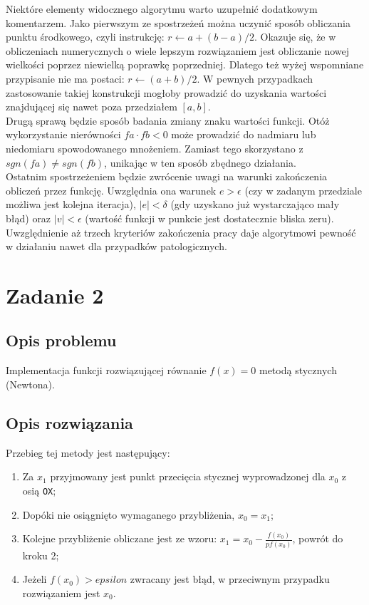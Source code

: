 \documentclass{classrep}
\begin{document}
		Niektóre elementy widocznego algorytmu warto uzupełnić dodatkowym komentarzem. Jako pierwszym ze spostrzeżeń można uczynić sposób obliczania punktu środkowego, czyli instrukcję: $r \leftarrow a+(b-a)/2$. Okazuje się, że w obliczeniach numerycznych o wiele lepszym rozwiązaniem jest obliczanie nowej wielkości poprzez niewielką poprawkę poprzedniej. Dlatego też wyżej wspomniane przypisanie nie ma postaci: $r \leftarrow (a+b)/2$. W pewnych przypadkach zastosowanie takiej konstrukcji mogłoby prowadzić do uzyskania wartości znajdującej się nawet poza przedziałem $[a,b]$.
		\\ Drugą sprawą będzie sposób badania zmiany znaku wartości funkcji. Otóż wykorzystanie nierówności $fa\cdot fb < 0$ może prowadzić do nadmiaru lub niedomiaru spowodowanego mnożeniem. Zamiast tego skorzystano z $sgn(fa) \neq sgn(fb)$, unikając w ten sposób zbędnego działania.
		\\ Ostatnim spostrzeżeniem będzie zwrócenie uwagi na warunki zakończenia obliczeń przez funkcję. Uwzględnia ona warunek $e > \epsilon$ (czy w zadanym przedziale możliwa jest kolejna iteracja), $|e| < \delta$ (gdy uzyskano już wystarczająco mały błąd) oraz $|v| < \epsilon$ (wartość funkcji w punkcie jest dostatecznie bliska zeru). Uwzględnienie aż trzech kryteriów zakończenia pracy daje algorytmowi pewność w działaniu nawet dla przypadków patologicznych.
	
\section{Zadanie 2}
	\subsection{Opis problemu}
		Implementacja funkcji rozwiązującej równanie $f(x)=0$ metodą stycznych (Newtona).
		
	\subsection{Opis rozwiązania}	
		Przebieg tej metody jest następujący:
		\begin{enumerate}
			\item Za $x_1$ przyjmowany jest punkt przecięcia stycznej wyprowadzonej dla $x_0$ z osią \texttt{OX};
			\item Dopóki nie osiągnięto wymaganego przybliżenia, $x_0 = x_1$;
			\item Kolejne przybliżenie obliczane jest ze wzoru: $x_1 = x_0-\frac{f(x_0)}{pf(x_0)}$, powrót do kroku 2;
			\item Jeżeli $f(x_0)>epsilon$ zwracany jest błąd, w przeciwnym przypadku rozwiązaniem jest $x_0$.
		\end{enumerate}	
	
\end{document}
